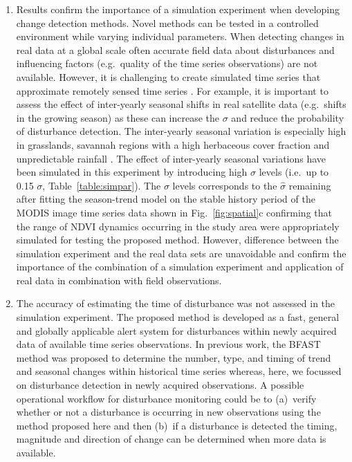 \documentclass[authoryear,preprint,review,10pt]{elsarticle}
\begin{document}
\begin{enumerate}[(1)]
\item Results confirm the importance of a simulation experiment when developing change detection methods. Novel methods can be tested in a controlled environment while varying individual parameters. When detecting changes in real data at a global scale often accurate field data about disturbances and influencing factors (e.g.\ quality of the time series observations) are not available. However, it is challenging to create simulated time series that approximate remotely sensed time series \citep{Zhang2009}. For example, it is important to assess the effect of inter-yearly seasonal shifts in real satellite data (e.g.\ shifts in the growing season) as these can increase the $\sigma$ and reduce the probability of disturbance detection. The inter-yearly seasonal variation is especially high in grasslands, savannah regions with a high herbaceous cover fraction and unpredictable rainfall \citep{deJong:wo}. The effect of inter-yearly seasonal variations have been simulated in this experiment by introducing high $\sigma$ levels (i.e.\ up to 0.15 $\sigma$, Table~\ref{table:simpar}). The $\sigma$ levels corresponds to the $\hat\sigma$ remaining after fitting the season-trend model on the stable history period of the MODIS image time series data shown in Fig.~\ref{fig:spatial}c confirming that the range of NDVI dynamics occurring in the study area were appropriately simulated for testing the proposed method. However, difference between the simulation experiment and the real data sets are unavoidable and confirm the importance of the combination of a simulation experiment and application of real data in combination with field observations. 


\item The accuracy of estimating the time of disturbance was not assessed in the simulation experiment. The proposed method is developed as a fast, general and globally applicable alert system for disturbances within newly acquired data of available time series observations. In previous work, the BFAST method was proposed to determine the number, type, and timing of trend and seasonal changes within historical time series \citep{Verbesselt2009a} whereas, here, we focussed on disturbance detection in newly acquired observations. A possible operational workflow for disturbance monitoring could be to (a)~verify whether or not a disturbance is occurring in new observations using the method proposed here and then (b)~if a disturbance is detected the timing, magnitude and direction of change can be determined when more data is available.  


\end{enumerate}
\end{document}
